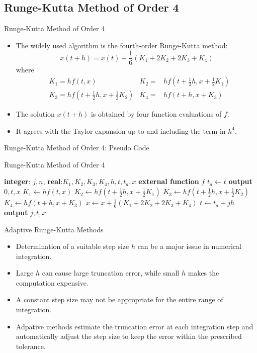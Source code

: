 \documentclass{beamer}
\newcommand{\beforeverb}{\footnotesize}
\newcommand{\afterverb}{\normalsize}
\begin{document}
\subsection[Runge-Kutta Method of Order 4]{Runge-Kutta Method of Order 4}
\begin{frame}{Runge-Kutta Method of Order 4}
\begin{itemize}
\item The widely used algorithm is the fourth-order Runge-Kutta method:
\[
x(t+h)=x(t)+\frac{1}{6}(K_1+2K_2+2K_3+K_4)
\]
where
\begin{align*}
&K_1=hf(t,x)  &K_2=&hf(t+\frac{1}{2}h,x+\frac{1}{2} K_1)\\
&K_3=hf(t+\frac{1}{2}h,x+\frac{1}{2} K_2) &K_4=&hf(t+h,x+ K_3)
\end{align*}
\item The solution $x(t+h)$  is obtained by \alert{four} function evaluations of $f$.
\item It agrees with the Taylor expansion up to and including the term in $h^4$.
\end{itemize}
\end{frame}
\begin{frame}{Runge-Kutta Method of Order 4: Pseudo Code}
\beforeverb
\begin{block}{Runge-Kutta Method of Order 4}
\begin{algorithmic}[1]
\State \textbf{integer}: $j, n$, \textbf{real}:$K_1, K_2, K_3, K_4, h, t, t_a, x$
\State \textbf{external function} $f$
\State $t_a\gets t $
\State \textbf{output} $0,t,x$
\State $K_1 \gets h f(t,x)$
\State $K_2 \gets hf(t+\frac{1}{2}h,x+\frac{1}{2} K_1)$
\State $K_3 \gets hf(t+\frac{1}{2}h,x+\frac{1}{2} K_2)$
\State $K_4 \gets hf(t+h,x+ K_3)$
\State $x\gets x+\frac{1}{6}(K_1+2K_2+2K_3+K_4)$
\State $t\gets t_a+jh$
\State \textbf{output} $j,t,x$
\EndFor
\EndProcedure
\end{algorithmic}
\end{block}
\afterverb

\end{frame}
\begin{frame}{Adaptive Runge-Kutta Methods}
\begin{itemize}
\item Determination of a suitable step size $h$ can be a major issue in numerical integration.
\item Large $h$ can cause large truncation error, while small $h$ makes the computation expensive.
\item A constant step size may not be appropriate for the entire range of integration.
\item \alert{Adpative methods} estimate the truncation error at each integration step and automatically adjust the step size to keep the error within the prescribed \alert{tolerance}.

\end{itemize}
\end{frame}
\end{document}
